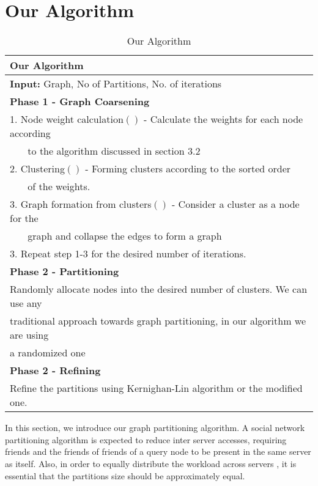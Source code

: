 \documentclass[letterpaper]{article}
\begin{document}
\section{Our Algorithm}
\begin{table*}[htb]
\centering
\begin{tabular}{|l|}%
\hline
\textbf{Our Algorithm}\\
\hline
\textbf{Input: }Graph, No of Partitions, No. of iterations\\
\hline
\textbf{Phase 1 - Graph Coarsening }\\
1. Node weight calculation$()$ - Calculate the weights for each node according \\
~~~ to the algorithm discussed in section 3.2\\
2. Clustering$()$ - Forming clusters according to the sorted order\\
~~~ of the weights.\\
3. Graph formation from clusters$()$ - Consider a cluster as a node for the\\
~~~ graph and collapse the edges to form a graph\\
3. Repeat step 1-3 for the desired number of iterations.\\


\textbf{Phase 2 - Partitioning}\\
 Randomly allocate nodes into the desired number of clusters. We can use any\\
traditional approach towards graph partitioning, in our algorithm  we are using\\
a randomized one\\

\textbf{Phase 2 - Refining}\\
 Refine the partitions using Kernighan-Lin algorithm or the modified one.\\
\hline
\end{tabular}
\caption{Our Algorithm}
\label{alg}
\end{table*}

In this section, we introduce our graph partitioning algorithm. A social
network  partitioning algorithm is expected to reduce inter server accesses,
requiring friends and the friends of friends of a query node to be present in
the same server as itself.   Also, in order to equally distribute the workload
across servers , it is essential that the partitions size should be
approximately equal.
\end{document}
